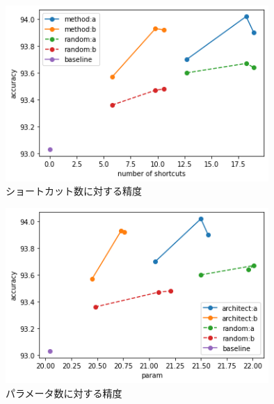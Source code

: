 
\begin{figure}[t]
  \begin{center}
    \includegraphics[clip,width=10cm]{./fig/short.png}
  \end{center}
  \caption{ショートカット数に対する精度}
  \label{fig:short}
\end{figure}
\begin{figure}[t]
  \begin{center}
    \includegraphics[clip,width=10cm]{./fig/param.png}
  \end{center}
  \caption{パラメータ数に対する精度}
  \label{fig:param}
\end{figure}

